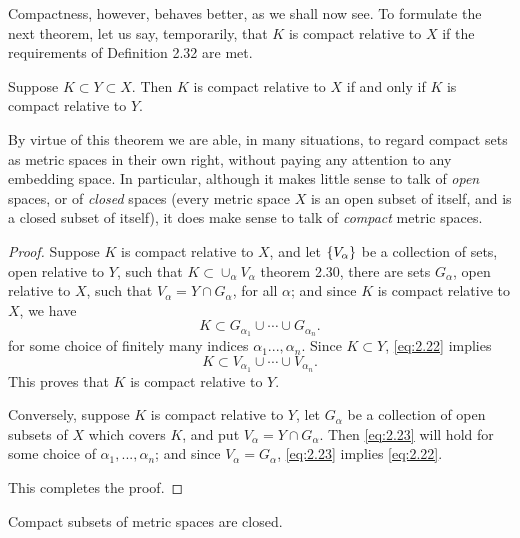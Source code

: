Compactness, however, behaves better, as we shall now see. To formulate the next theorem, let us say, temporarily, that $K$ is compact relative to $X$ if the requirements of Definition 2.32 are met.

\begin{thm}
    \label{thm:2.33}
    Suppose $K \subset Y \subset X$. Then $K$ is compact relative to $X$ if and only if $K$ is compact relative to $Y$.
\end{thm}

By virtue of this theorem we are able, in many situations,
to regard compact sets as metric spaces in their own right,
without paying any attention to any embedding space.
In particular, although it makes little sense to talk of \emph{open} spaces,
or of \emph{closed} spaces
(every metric space $X$ is an open subset of itself,
and is a closed subset of itself),
it does make sense to talk of \emph{compact} metric spaces.

\begin{proof}
    Suppose $K$ is compact relative to $X$, and let $\protect\{V_\alpha\}$ be a collection of sets, open relative to $Y$, such that $K \subset \cup_\alpha V_\alpha$ theorem 2.30, there are sets $G_\alpha$, open relative to $X$, such that $V_\alpha = Y \cap G_\alpha$, for all $\alpha$; and since $K$ is compact relative to $X$, we have
    \begin{equation}\label{eq:2.22}
        K \subset G_{\alpha_{1}} \cup \cdots \cup G_{\alpha_{n}}.
    \end{equation}
    for some choice of finitely many indices $\alpha_1 ..., \alpha_n$. Since $K \subset Y$, \ref{eq:2.22} implies
    \begin{equation}\label{eq:2.23}
        K \subset V_{\alpha_{1}} \cup \cdots \cup V_{\alpha_{n}}.
    \end{equation}
    This proves that $K$ is compact relative to $Y$.

    Conversely, suppose $K$ is compact relative to $Y$, let $G_\alpha$ be a collection of open subsets of $X$ which covers $K$, and put $V_\alpha = Y \cap G_\alpha$. Then \ref{eq:2.23} will hold for some choice of $\alpha_1, ...,\alpha_n$; and since $V_\alpha = G_\alpha$, \ref{eq:2.23} implies \ref{eq:2.22}.

    This completes the proof.
\end{proof}

\begin{thm}
    \label{thm:2.34}
    Compact subsets of metric spaces are closed.
\end{thm}

